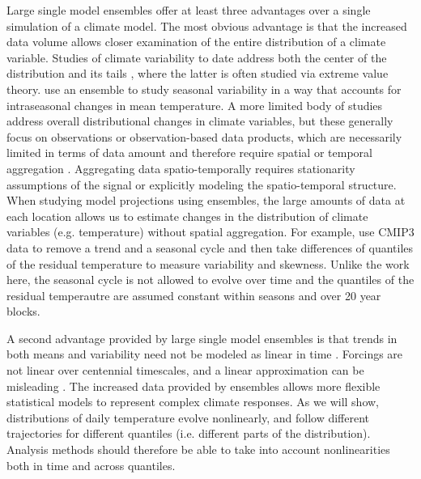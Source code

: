 \documentclass{ametsoc}
\begin{document}
Large single model ensembles offer at least three advantages over a single simulation of a climate model. The most obvious advantage is that the increased data volume allows closer examination of the entire distribution of a climate variable.
 Studies of climate variability to date address both the center of the distribution 
\citep[e.g.][]{semenov2002secular,raisanen2002co2, kitoh2009changes, screen2014arctic, schneider2015physics} and its tails \citep[e.g.][]{katz1992extreme, meehl2009relative, northrop2011threshold, davison2012statistical, huser2014space, trenberth2015attribution, huang2015estimating, jalbert2017spatiotemporal}, where the latter is often studied via extreme value theory. \citet{fischer2009future} use an ensemble to study seasonal variability in a way that accounts for intraseasonal changes in mean temperature.
A more limited body of studies address overall distributional changes in climate variables, but these generally focus on observations or observation-based data products, which are necessarily limited in terms of data amount and therefore require spatial or temporal aggregation \citep{donat2012shifting, stainforth2013mapping, chapman2013estimating, huybers2014us, mckinnon2016changing, rhines2017seasonally}. Aggregating data spatio-temporally requires stationarity assumptions of the signal or explicitly modeling the spatio-temporal structure. When studying model projections using ensembles, the large amounts of data at each location allows us to estimate changes in the distribution of climate variables (e.g. temperature) without spatial aggregation. For example, \citet{ylhaisi2014twenty} use CMIP3 data to remove a trend and a seasonal cycle and then take differences of quantiles of the residual temperature to measure variability and skewness. Unlike the work here, the seasonal cycle is not allowed to evolve over time and the quantiles of the residual temperautre are assumed constant within seasons and over 20 year blocks.

A second advantage provided by large single model ensembles is that trends in both means and variability need not be modeled as linear in time \citep{franzke2015local,gao2017quantile}. Forcings are not linear over centennial timescales, and a linear approximation can be misleading \citep[see for example][]{poppick2017estimating}. The increased data provided by ensembles allows more flexible statistical models to represent complex climate responses. 
As we will show, distributions of daily temperature evolve nonlinearly, and follow different trajectories for different quantiles (i.e. different parts of the distribution). 
Analysis methods should therefore be able to take into account nonlinearities both in time and across quantiles. 
\end{document}
